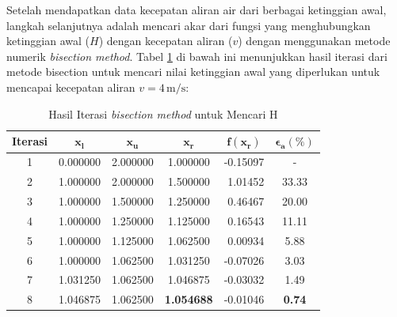 \documentclass[conference]{IEEEtran}
\begin{document}
Setelah mendapatkan data kecepatan aliran air dari berbagai ketinggian awal, langkah selanjutnya adalah mencari akar dari fungsi yang menghubungkan ketinggian awal ($H$) dengan kecepatan aliran ($v$) dengan menggunakan metode numerik \textit{bisection method}. Tabel \ref{tab:hasil_bisection} di bawah ini menunjukkan hasil iterasi dari metode bisection untuk mencari nilai ketinggian awal yang diperlukan untuk mencapai kecepatan aliran $v = 4 \, \text{m/s}$:
\begin{table}[htbp]
\centering
\caption{Hasil Iterasi \textit{bisection method} untuk Mencari H}
\label{tab:hasil_bisection}
\renewcommand{\arraystretch}{1.2}
\begin{tabular}{|c|c|c|c|r|c|}
\hline
\textbf{Iterasi} & $\boldsymbol{x_l}$ & $\boldsymbol{x_u}$ & $\boldsymbol{x_r}$ & \multicolumn{1}{c|}{$\boldsymbol{f(x_r)}$} & $\boldsymbol{\epsilon_a (\%)}$ \\
\hline
1 & 0.000000 & 2.000000 & 1.000000 & -0.15097 & - \\
2 & 1.000000 & 2.000000 & 1.500000 & 1.01452 & 33.33 \\
3 & 1.000000 & 1.500000 & 1.250000 & 0.46467 & 20.00 \\
4 & 1.000000 & 1.250000 & 1.125000 & 0.16543 & 11.11 \\
5 & 1.000000 & 1.125000 & 1.062500 & 0.00934 & 5.88  \\
6 & 1.000000 & 1.062500 & 1.031250 & -0.07026 & 3.03  \\
7 & 1.031250 & 1.062500 & 1.046875 & -0.03032 & 1.49  \\
8 & 1.046875 & 1.062500 & \textbf{1.054688} & -0.01046 & \textbf{0.74} \\
\hline
\end{tabular}
\end{table}
\end{document}
